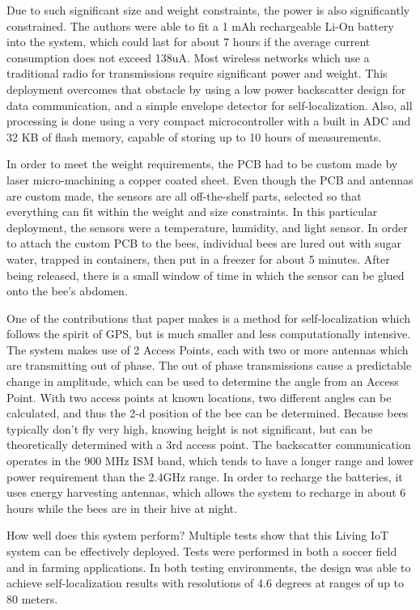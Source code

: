 \documentclass[letterpaper,twocolumn,10pt]{article}
\begin{document}
Due to such significant size and weight constraints, the power is also significantly constrained. The authors were able to fit a 1 mAh rechargeable Li-On battery into the system, which could last for about 7 hours if the average current consumption does not exceed 138uA. Most wireless networks which use a traditional radio for transmissions require significant power and weight. This deployment overcomes that obstacle by using a low power backscatter design for data communication, and a simple envelope detector for self-localization. Also, all processing is done using a very compact microcontroller with a built in ADC and 32 KB of flash memory, capable of storing up to 10 hours of measurements. 

In order to meet the weight requirements, the PCB had to be custom made by laser micro-machining a copper coated sheet. Even though the PCB and antennas are custom made, the sensors are all off-the-shelf parts, selected so that everything can fit within the weight and size constraints. In this particular deployment, the sensors were a temperature, humidity, and light sensor. In order to attach the custom PCB to the bees, individual bees are lured out with sugar water, trapped in containers, then put in a freezer for about 5 minutes. After being released, there is a small window of time in which the sensor can be glued onto the bee's abdomen.

One of the contributions that paper makes is a method for self-localization which follows the spirit of GPS, but is much smaller and less computationally intensive. The system makes use of 2 Access Points, each with two or more antennas which are transmitting out of phase. The out of phase transmissions cause a predictable change in amplitude, which can be used to determine the angle from an Access Point. With two access points at known locations, two different angles can be calculated, and thus the 2-d position of the bee can be determined. Because bees typically don't fly very high, knowing height is not significant, but can be theoretically determined with a 3rd access point. The backscatter communication operates in the 900 MHz ISM band, which tends to have a longer range and lower power requirement than the 2.4GHz range. In order to recharge the batteries, it uses energy harvesting antennas, which allows the system to recharge in about 6 hours while the bees are in their hive at night.

How well does this system perform? Multiple tests show that this Living IoT system can be effectively deployed. Tests were performed in both a soccer field and in farming applications. In both testing environments, the design was able to achieve self-localization results with resolutions of 4.6 degrees at ranges of up to 80 meters. 
\end{document}
